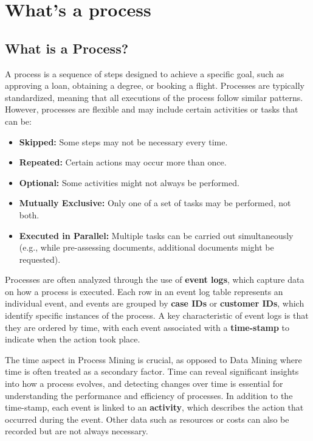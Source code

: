 \chapter{What's a process}
    \section{What is a Process?}
    
    A process is a sequence of steps designed to achieve a specific goal, such as approving a loan, obtaining a degree, or booking a flight. Processes are typically standardized, meaning that all executions of the process follow similar patterns. However, processes are flexible and may include certain activities or tasks that can be:
    \begin{itemize}
        \item \textbf{Skipped:} Some steps may not be necessary every time.
        \item \textbf{Repeated:} Certain actions may occur more than once.
        \item \textbf{Optional:} Some activities might not always be performed.
        \item \textbf{Mutually Exclusive:} Only one of a set of tasks may be performed, not both.
        \item \textbf{Executed in Parallel:} Multiple tasks can be carried out simultaneously (e.g., while pre-assessing documents, additional documents might be requested).
    \end{itemize}
    
    Processes are often analyzed through the use of \textbf{event logs}, which capture data on how a process is executed. Each row in an event log table represents an individual event, and events are grouped by \textbf{case IDs} or \textbf{customer IDs}, which identify specific instances of the process. A key characteristic of event logs is that they are ordered by time, with each event associated with a \textbf{time-stamp} to indicate when the action took place. 
    
    The time aspect in Process Mining is crucial, as opposed to Data Mining where time is often treated as a secondary factor. Time can reveal significant insights into how a process evolves, and detecting changes over time is essential for understanding the performance and efficiency of processes. In addition to the time-stamp, each event is linked to an \textbf{activity}, which describes the action that occurred during the event. Other data such as resources or costs can also be recorded but are not always necessary.
    
